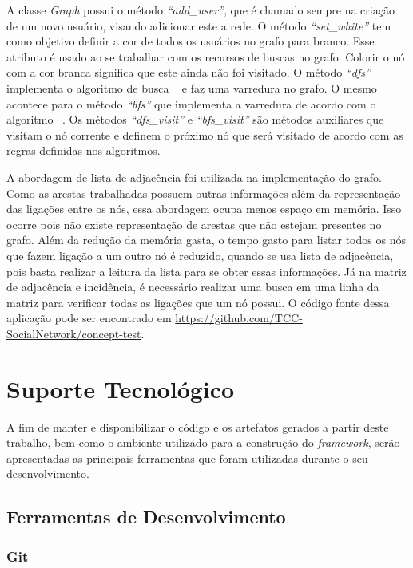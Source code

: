 \begin{apendicesenv}
A classe \textit{Graph} possui o método \textit{``add\_user''}, que é chamado sempre na criação de um novo usuário, visando adicionar este a rede. O método \textit{``set\_white''} tem como objetivo definir a cor de todos os usuários no grafo para branco. Esse atributo é usado ao se trabalhar com os recursos de buscas no grafo. Colorir o nó com a cor branca significa que este ainda não foi visitado. O método \textit{``dfs''} implementa o algoritmo de busca ~ e faz uma varredura no grafo. O mesmo acontece para o método \textit{``bfs''} que implementa a varredura de acordo com o algoritmo ~. Os métodos \textit{``dfs\_visit''} e \textit{``bfs\_visit''} são métodos auxiliares que visitam o nó corrente e definem o próximo nó que será visitado de acordo com as regras definidas nos algoritmos.

A abordagem de lista de adjacência foi utilizada na implementação do grafo. Como as arestas trabalhadas possuem outras informações além da representação das ligações entre os nós, essa abordagem ocupa menos espaço em memória. Isso ocorre pois não existe representação de arestas que não estejam presentes no grafo. Além da redução da memória gasta, o tempo gasto para listar todos os nós que fazem ligação a um outro nó é reduzido, quando se usa lista de adjacência, pois basta realizar a leitura da lista para se obter essas informações. Já na matriz de adjacência e incidência, é necessário realizar uma busca em uma linha da matriz para verificar todas as ligações que um nó possui. O código fonte dessa aplicação pode ser encontrado em \url{https://github.com/TCC-SocialNetwork/concept-test}.

\chapter{Suporte Tecnológico}
\label{chapter:Suporte_Tecnologico}

A fim de manter e disponibilizar o código e os artefatos gerados a partir deste trabalho, bem como o ambiente utilizado para a construção do \textit{framework}, serão apresentadas as principais ferramentas que foram utilizadas durante o seu desenvolvimento.

\section{Ferramentas de Desenvolvimento}

\subsection{Git}


\end{apendicesenv}
